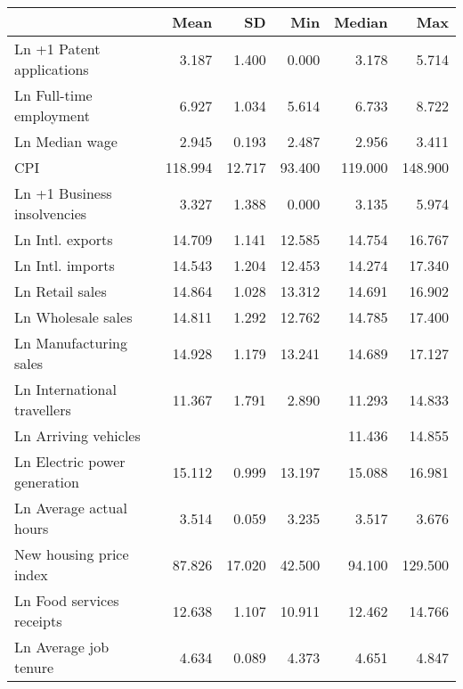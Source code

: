 
\begin{tabular}[t]{lrrrrr}
\toprule
  & Mean & SD & Min & Median & Max\\
\midrule
Ln +1 Patent applications & \num{3.187} & \num{1.400} & \num{0.000} & \num{3.178} & \num{5.714}\\
Ln Full-time employment & \num{6.927} & \num{1.034} & \num{5.614} & \num{6.733} & \num{8.722}\\
Ln Median wage & \num{2.945} & \num{0.193} & \num{2.487} & \num{2.956} & \num{3.411}\\
CPI & \num{118.994} & \num{12.717} & \num{93.400} & \num{119.000} & \num{148.900}\\
Ln +1 Business insolvencies & \num{3.327} & \num{1.388} & \num{0.000} & \num{3.135} & \num{5.974}\\
Ln Intl. exports & \num{14.709} & \num{1.141} & \num{12.585} & \num{14.754} & \num{16.767}\\
Ln Intl. imports & \num{14.543} & \num{1.204} & \num{12.453} & \num{14.274} & \num{17.340}\\
Ln Retail sales & \num{14.864} & \num{1.028} & \num{13.312} & \num{14.691} & \num{16.902}\\
Ln Wholesale sales & \num{14.811} & \num{1.292} & \num{12.762} & \num{14.785} & \num{17.400}\\
Ln Manufacturing sales & \num{14.928} & \num{1.179} & \num{13.241} & \num{14.689} & \num{17.127}\\
Ln International travellers & \num{11.367} & \num{1.791} & \num{2.890} & \num{11.293} & \num{14.833}\\
Ln Arriving vehicles &  &  &  & \num{11.436} & \num{14.855}\\
Ln Electric power generation & \num{15.112} & \num{0.999} & \num{13.197} & \num{15.088} & \num{16.981}\\
Ln Average actual hours & \num{3.514} & \num{0.059} & \num{3.235} & \num{3.517} & \num{3.676}\\
New housing price index & \num{87.826} & \num{17.020} & \num{42.500} & \num{94.100} & \num{129.500}\\
Ln Food services receipts & \num{12.638} & \num{1.107} & \num{10.911} & \num{12.462} & \num{14.766}\\
Ln Average job tenure & \num{4.634} & \num{0.089} & \num{4.373} & \num{4.651} & \num{4.847}\\
\bottomrule
\end{tabular}
